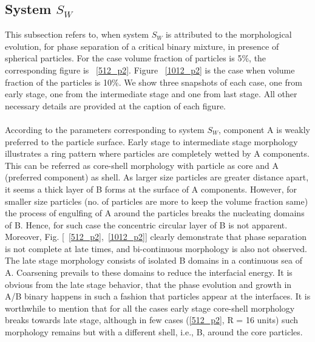 \documentclass[12pt]{iiscthes}
\theoremstyle{definition}
\theoremstyle{definition}
\theoremstyle{remark}
\begin{document}
\subsection{System $S_W$}
This subsection refers to, when system $S_W$ is attributed to the morphological evolution, for phase separation of a critical binary mixture, in presence of spherical particles. For the case volume fraction of particles is 5\%, the corresponding figure is ~\ref{512_p2}. Figure ~\ref{1012_p2} is the case when volume fraction of the particles is 10\%.  We show three snapshots of each case, one from early stage, one from the intermediate stage and one from last stage. All other necessary details are provided at the caption of each figure.\\
\\
According to the parameters corresponding to system $S_W$, component A is weakly preferred to the particle surface. Early stage to intermediate stage morphology illustrates a ring pattern where particles are completely wetted by A components. This can be referred as core-shell morphology with particle as core and A (preferred component) as shell. As larger size particles are greater distance apart, it seems a thick layer of B forms at the surface of A components. However, for smaller size particles (no. of particles are more to keep the volume fraction same) the process of engulfing of A around the particles breaks the  nucleating domains of B. Hence, for such case the concentric circular layer of B is not apparent. Moreover, Fig. [~\ref{512_p2},~\ref{1012_p2}] clearly demonstrate that phase separation is not complete at late times, and bi-continuous morphology is also not observed. The late stage morphology consists of isolated B domains in a continuous sea of A. Coarsening prevails to these domains to reduce the interfacial energy. It is obvious from the late stage behavior, that the phase evolution and growth in A/B binary happens in such a fashion that particles appear at the interfaces. It is worthwhile to mention that for all the cases early stage core-shell morphology breaks towards late stage, although in few cases (\ref{512_p2}, R = 16 units) such morphology remains but with a different shell, i.e., B, around the core particles.  
\newpage
\end{document}
